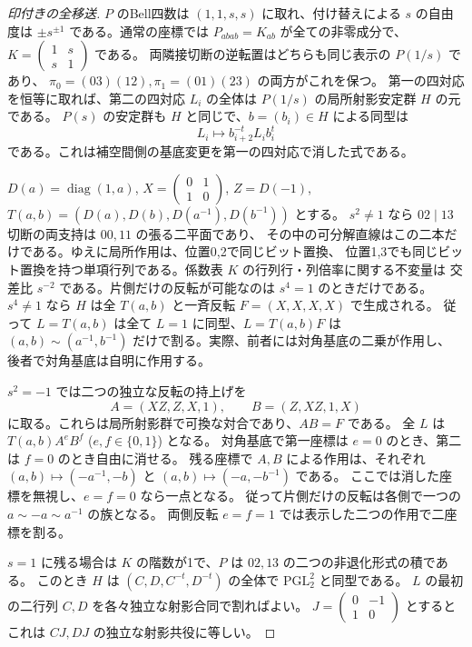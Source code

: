 \begin{proof}[印付きの全移送]
$P$ のBell四数は $(1,1,s,s)$ に取れ、付け替えによる $s$ の自由度は
$\pm s^{\pm1}$ である。通常の座標では $P_{abab}=K_{ab}$ が全ての非零成分で、
$K=\left(\begin{smallmatrix}1&s\\s&1\end{smallmatrix}\right)$ である。
両隣接切断の逆転置はどちらも同じ表示の $P(1/s)$ であり、
$\pi_0=(03)(12),\pi_1=(01)(23)$ の両方がこれを保つ。
第一の四対応を恒等に取れば、第二の四対応 $L_i$ の全体は
$P(1/s)$ の局所射影安定群 $H$ の元である。
$P(s)$ の安定群も $H$ と同じで、$b=(b_i)\in H$ による同型は
\[
                   L_i\longmapsto b_{i+2}^{-t}L_i b_i^t
\]
である。これは補空間側の基底変更を第一の四対応で消した式である。

$D(a)=\operatorname{diag}(1,a)$, $X=\left(\begin{smallmatrix}0&1\\1&0\end{smallmatrix}\right)$,
$Z=D(-1)$, $T(a,b)=(D(a),D(b),D(a^{-1}),D(b^{-1}))$ とする。
$s^2\ne1$ なら $02\mid13$ 切断の両支持は $00,11$ の張る二平面であり、
その中の可分解直線はこの二本だけである。ゆえに局所作用は、位置0,2で同じビット置換、
位置1,3でも同じビット置換を持つ単項行列である。係数表 $K$ の行列行・列倍率に関する不変量は
交差比 $s^{-2}$ である。片側だけの反転が可能なのは $s^4=1$ のときだけである。
$s^4\ne1$ なら $H$ は全 $T(a,b)$ と一斉反転 $F=(X,X,X,X)$ で生成される。
従って $L=T(a,b)$ は全て $L=1$ に同型、$L=T(a,b)F$ は
$(a,b)\sim(a^{-1},b^{-1})$ だけで割る。実際、前者には対角基底の二乗が作用し、
後者で対角基底は自明に作用する。

$s^2=-1$ では二つの独立な反転の持上げを
\[
           A=(XZ,Z,X,1),\qquad B=(Z,XZ,1,X)
\]
に取る。これらは局所射影群で可換な対合であり、$AB=F$ である。
全 $L$ は $T(a,b)A^e B^f$ ($e,f\in\{0,1\}$) となる。
対角基底で第一座標は $e=0$ のとき、第二は $f=0$ のとき自由に消せる。
残る座標で $A,B$ による作用は、それぞれ
$(a,b)\mapsto(-a^{-1},-b)$ と $(a,b)\mapsto(-a,-b^{-1})$ である。
ここでは消した座標を無視し、$e=f=0$ なら一点となる。
従って片側だけの反転は各側で一つの $a\sim-a\sim a^{-1}$ の族となる。
両側反転 $e=f=1$ では表示した二つの作用で二座標を割る。

$s=1$ に残る場合は $K$ の階数が1で、$P$ は $02,13$ の二つの非退化形式の積である。
このとき $H$ は $(C,D,C^{-t},D^{-t})$ の全体で $\mathrm{PGL}_2^2$ と同型である。
$L$ の最初の二行列 $C,D$ を各々独立な射影合同で割ればよい。
$J=\left(\begin{smallmatrix}0&-1\\1&0\end{smallmatrix}\right)$ とすると
これは $CJ,DJ$ の独立な射影共役に等しい。
\end{proof}
